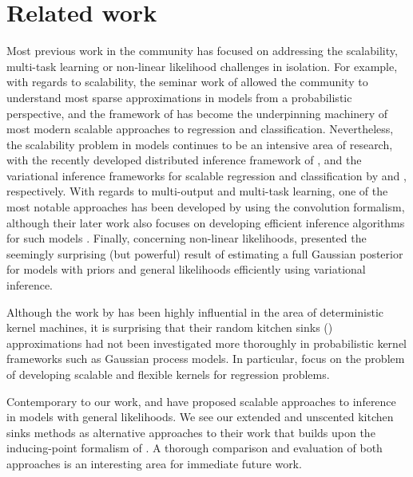 \section{Related work}
Most previous work in the \gp community has focused on addressing  
the scalability, multi-task learning or non-linear likelihood challenges in
isolation. For example, with regards to scalability, the seminar work of \citet{quinonero2005unifying} allowed the 
community to understand most sparse approximations in \gp models from a probabilistic perspective, 
 and the   framework of \citet{titsias2009variational} has become the  underpinning  machinery
 of  most modern scalable approaches to \gp regression and classification.  
 Nevertheless, the scalability 
 problem in \gp models continues to be an intensive area of research, with the
 recently developed distributed inference framework of \citet{gal-et-al-nips-2014}, and the  variational inference
 frameworks for scalable \gp regression and classification by 
 \citet{hensmangaussian} and \citet{hensman-et-al-aistats-2015}, respectively. 
 With regards to multi-output and multi-task learning,  one of the most notable approaches has 
 been developed by  \citet{alvarez-lawrence-nips-08} using the convolution formalism, although 
 their later work also focuses on developing efficient inference algorithms for such models
\citep{alvarez2011computationally}.
%
 Finally, concerning non-linear likelihoods, \citet{opper-arch-nc-2009} presented 
 the seemingly surprising (but powerful) result of estimating a full Gaussian posterior 
for models with \gp priors and general \iid  likelihoods efficiently using variational inference.  
 
Although the work by \citet{rahimi-recht-nips-2007,rahimi-recht-nips-2008} has been highly 
influential in the area of deterministic kernel machines, it is surprising that their 
random kitchen sinks (\rks) approximations had not been investigated more 
thoroughly in probabilistic kernel frameworks 
such as Gaussian process models. 
In particular,  \citet{yang-et-al-aistats-2015}  focus on the problem of developing scalable 
and flexible kernels for regression problems. 

Contemporary to our work,  \citet{hensman-et-al-nips-2015} and \citet{dezfouli-bonilla-nips-2015}   
have  proposed scalable approaches to inference in \gp models with general likelihoods. 
We see our extended and unscented kitchen sinks methods as alternative approaches to their
work that builds upon the inducing-point formalism of \citet{titsias2009variational}.
A thorough comparison and evaluation of both approaches is  an interesting 
area for immediate future work.

 
